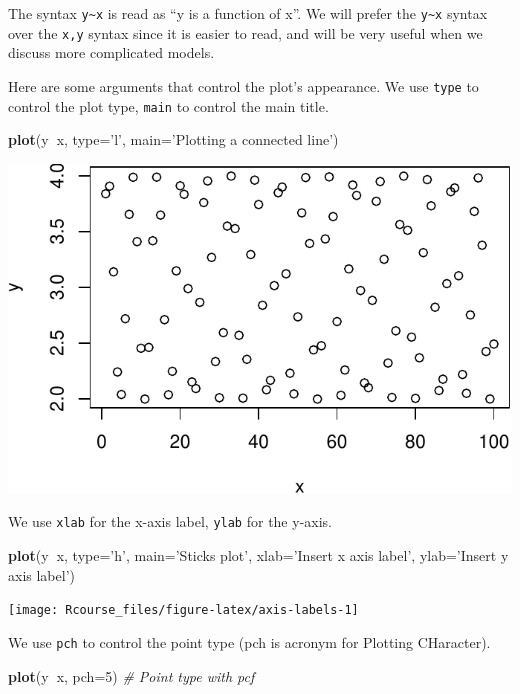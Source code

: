 \documentclass[]{book}
\newenvironment{Shaded}{\begin{snugshade}}{\end{snugshade}}
\newcommand{\KeywordTok}[1]{\textcolor[rgb]{0.13,0.29,0.53}{\textbf{#1}}}
\newcommand{\DataTypeTok}[1]{\textcolor[rgb]{0.13,0.29,0.53}{#1}}
\newcommand{\DecValTok}[1]{\textcolor[rgb]{0.00,0.00,0.81}{#1}}
\newcommand{\StringTok}[1]{\textcolor[rgb]{0.31,0.60,0.02}{#1}}
\newcommand{\CommentTok}[1]{\textcolor[rgb]{0.56,0.35,0.01}{\textit{#1}}}
\newcommand{\OperatorTok}[1]{\textcolor[rgb]{0.81,0.36,0.00}{\textbf{#1}}}
\newcommand{\NormalTok}[1]{#1}
\theoremstyle{definition}
\theoremstyle{definition}
\theoremstyle{definition}
\theoremstyle{remark}
\begin{document}
The syntax \texttt{y\textasciitilde{}x} is read as ``y is a function of
x''. We will prefer the \texttt{y\textasciitilde{}x} syntax over the
\texttt{x,y} syntax since it is easier to read, and will be very useful
when we discuss more complicated models.

Here are some arguments that control the plot's appearance. We use
\texttt{type} to control the plot type, \texttt{main} to control the
main title.

\begin{Shaded}
\begin{Highlighting}[]
\KeywordTok{plot}\NormalTok{(y}\OperatorTok{~}\NormalTok{x, }\DataTypeTok{type=}\StringTok{'l'}\NormalTok{, }\DataTypeTok{main=}\StringTok{'Plotting a connected line'}\NormalTok{) }
\end{Highlighting}
\end{Shaded}

\includegraphics[width=0.5\linewidth]{Rcourse_files/figure-latex/unnamed-chunk-33-1}

We use \texttt{xlab} for the x-axis label, \texttt{ylab} for the y-axis.

\begin{Shaded}
\begin{Highlighting}[]
\KeywordTok{plot}\NormalTok{(y}\OperatorTok{~}\NormalTok{x, }\DataTypeTok{type=}\StringTok{'h'}\NormalTok{, }\DataTypeTok{main=}\StringTok{'Sticks plot'}\NormalTok{, }\DataTypeTok{xlab=}\StringTok{'Insert x axis label'}\NormalTok{, }\DataTypeTok{ylab=}\StringTok{'Insert y axis label'}\NormalTok{) }
\end{Highlighting}
\end{Shaded}

\texttt{[image: Rcourse\_files/figure-latex/axis-labels-1]}

We use \texttt{pch} to control the point type (pch is acronym for
Plotting CHaracter).

\begin{Shaded}
\begin{Highlighting}[]
\KeywordTok{plot}\NormalTok{(y}\OperatorTok{~}\NormalTok{x, }\DataTypeTok{pch=}\DecValTok{5}\NormalTok{) }\CommentTok{# Point type with pcf}
\end{Highlighting}
\end{Shaded}
\end{document}

